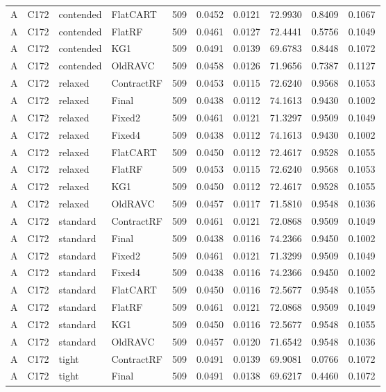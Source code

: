 \begin{longtable}{@{}llllllllll@{}}
A & C172 & contended & FlatCART & 509 & 0.0452 & 0.0121 & 72.9930 & 0.8409 & 0.1067\\
A & C172 & contended & FlatRF & 509 & 0.0461 & 0.0127 & 72.4441 & 0.5756 & 0.1049\\
A & C172 & contended & KG1 & 509 & 0.0491 & 0.0139 & 69.6783 & 0.8448 & 0.1072\\
A & C172 & contended & OldRAVC & 509 & 0.0458 & 0.0126 & 71.9656 & 0.7387 & 0.1127\\
A & C172 & relaxed & ContractRF & 509 & 0.0453 & 0.0115 & 72.6240 & 0.9568 & 0.1053\\
A & C172 & relaxed & Final & 509 & 0.0438 & 0.0112 & 74.1613 & 0.9430 & 0.1002\\
A & C172 & relaxed & Fixed2 & 509 & 0.0461 & 0.0121 & 71.3297 & 0.9509 & 0.1049\\
A & C172 & relaxed & Fixed4 & 509 & 0.0438 & 0.0112 & 74.1613 & 0.9430 & 0.1002\\
A & C172 & relaxed & FlatCART & 509 & 0.0450 & 0.0112 & 72.4617 & 0.9528 & 0.1055\\
A & C172 & relaxed & FlatRF & 509 & 0.0453 & 0.0115 & 72.6240 & 0.9568 & 0.1053\\
A & C172 & relaxed & KG1 & 509 & 0.0450 & 0.0112 & 72.4617 & 0.9528 & 0.1055\\
A & C172 & relaxed & OldRAVC & 509 & 0.0457 & 0.0117 & 71.5810 & 0.9548 & 0.1036\\
A & C172 & standard & ContractRF & 509 & 0.0461 & 0.0121 & 72.0868 & 0.9509 & 0.1049\\
A & C172 & standard & Final & 509 & 0.0438 & 0.0116 & 74.2366 & 0.9450 & 0.1002\\
A & C172 & standard & Fixed2 & 509 & 0.0461 & 0.0121 & 71.3299 & 0.9509 & 0.1049\\
A & C172 & standard & Fixed4 & 509 & 0.0438 & 0.0116 & 74.2366 & 0.9450 & 0.1002\\
A & C172 & standard & FlatCART & 509 & 0.0450 & 0.0116 & 72.5677 & 0.9548 & 0.1055\\
A & C172 & standard & FlatRF & 509 & 0.0461 & 0.0121 & 72.0868 & 0.9509 & 0.1049\\
A & C172 & standard & KG1 & 509 & 0.0450 & 0.0116 & 72.5677 & 0.9548 & 0.1055\\
A & C172 & standard & OldRAVC & 509 & 0.0457 & 0.0120 & 71.6542 & 0.9548 & 0.1036\\
A & C172 & tight & ContractRF & 509 & 0.0491 & 0.0139 & 69.9081 & 0.0766 & 0.1072\\
A & C172 & tight & Final & 509 & 0.0491 & 0.0138 & 69.6217 & 0.4460 & 0.1072\\

\end{longtable}

